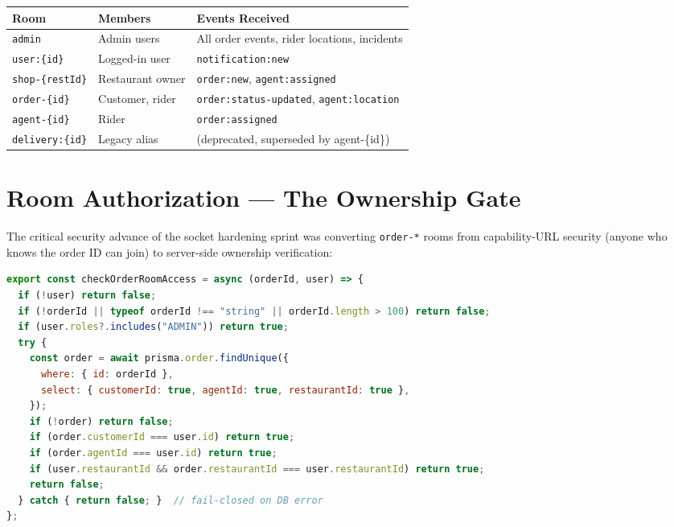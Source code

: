 \documentclass[11pt,a4paper,twoside]{book}
\newcommand{\th}[1]{\textbf{\color{white}#1}}
\begin{document}
\begin{center}\small
\begin{tabular}{p{3.5cm}p{3cm}p{6cm}}
\toprule
\rowcolor{headbg}\th{Room} & \th{Members} & \th{Events Received} \\
\midrule
\texttt{admin}           & Admin users    & All order events, rider locations, incidents \\
\rowcolor{rowalt}\texttt{user:\{id\}}       & Logged-in user & \texttt{notification:new} \\
\texttt{shop-\{restId\}} & Restaurant owner & \texttt{order:new}, \texttt{agent:assigned} \\
\rowcolor{rowalt}\texttt{order-\{id\}}      & Customer, rider & \texttt{order:status-updated}, \texttt{agent:location} \\
\texttt{agent-\{id\}}   & Rider          & \texttt{order:assigned} \\
\rowcolor{rowalt}\texttt{delivery:\{id\}}   & Legacy alias   & (deprecated, superseded by agent-\{id\}) \\
\bottomrule
\end{tabular}
\end{center}

\section{Room Authorization — The Ownership Gate}

The critical security advance of the socket hardening sprint was converting
\texttt{order-*} rooms from capability-URL security (anyone who knows the order
ID can join) to server-side ownership verification:

\begin{lstlisting}[language=JavaScript,caption={checkOrderRoomAccess — Prisma ownership gate}]
export const checkOrderRoomAccess = async (orderId, user) => {
  if (!user) return false;
  if (!orderId || typeof orderId !== "string" || orderId.length > 100) return false;
  if (user.roles?.includes("ADMIN")) return true;
  try {
    const order = await prisma.order.findUnique({
      where: { id: orderId },
      select: { customerId: true, agentId: true, restaurantId: true },
    });
    if (!order) return false;
    if (order.customerId === user.id) return true;
    if (order.agentId === user.id) return true;
    if (user.restaurantId && order.restaurantId === user.restaurantId) return true;
    return false;
  } catch { return false; }  // fail-closed on DB error
};
\end{lstlisting}
\end{document}
